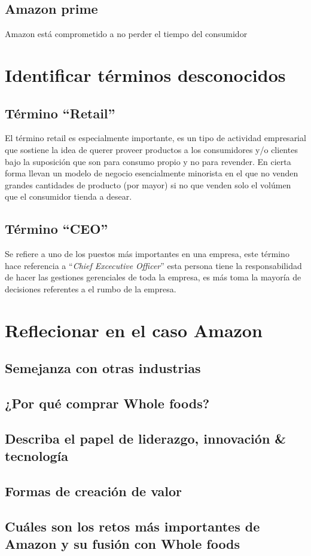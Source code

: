 \documentclass{article}
\begin{document}
\subsection{Amazon prime}
Amazon está comprometido a no perder el tiempo del consumidor


\section{Identificar términos desconocidos}
\subsection{Término ``Retail''}
El término retail es especialmente importante, es un tipo de actividad empresarial que sostiene la idea de querer proveer productos a los consumidores y/o clientes bajo la suposición que son para consumo propio y no para revender. En cierta forma llevan un modelo de negocio esencialmente minorista en el que no venden grandes cantidades de producto (por mayor) si no que venden solo el volúmen que el consumidor tienda a desear.
\subsection{Término ``CEO''}
Se refiere a uno de los puestos más importantes en una empresa, este término hace referencia a ``\emph{Chief Excecutive Officer}'' esta persona tiene la responsabilidad de hacer las gestiones gerenciales de toda la empresa, es más toma la mayoría de decisiones referentes a el rumbo de la empresa.

\section{Reflecionar en el caso Amazon}
\subsection{Semejanza con otras industrias}

\subsection{¿Por qué comprar Whole foods?}

\subsection{Describa el papel de liderazgo, innovación \& tecnología}

\subsection{Formas de creación de valor}

\subsection{Cuáles son los retos más importantes de Amazon y su fusión con Whole foods}
\end{document}
